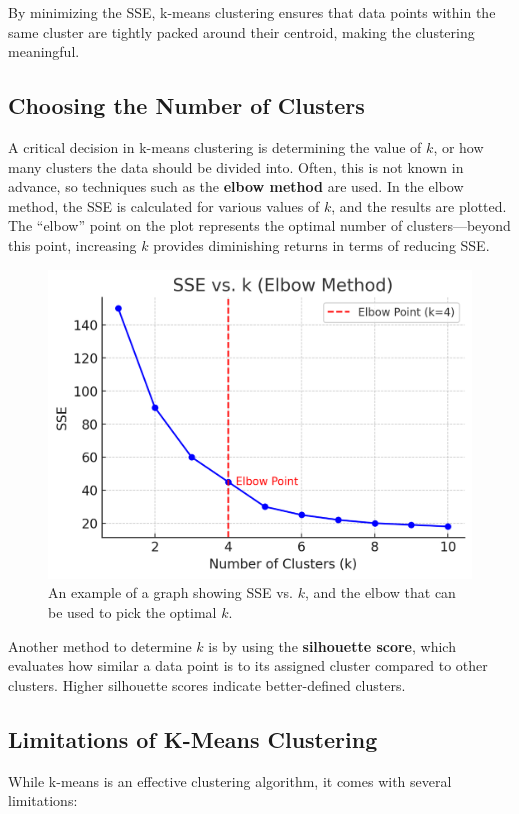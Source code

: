    By minimizing the SSE, k-means clustering ensures that data points within the same cluster are tightly packed around their centroid, making the clustering meaningful.

\subsection{Choosing the Number of Clusters}
    \large A critical decision in k-means clustering is determining the value of \( k \), or how many clusters the data should be divided into. Often, this is not known in advance, so techniques such as the \textbf{elbow method} are used. In the elbow method, the SSE is calculated for various values of \( k \), and the results are plotted. The ``elbow'' point on the plot represents the optimal number of clusters—beyond this point, increasing \( k \) provides diminishing returns in terms of reducing SSE.

    \begin{figure}[H]
        \centering
        \includegraphics[width=0.45\linewidth]{ml/SSEkElbowmethod.png}
        \caption{An example of a graph showing SSE vs. $k$, and the elbow that can be used to pick the optimal $k$.}
        \label{fig:SSEkElbowmethod}
    \end{figure}

    Another method to determine \( k \) is by using the \textbf{silhouette score}, which evaluates how similar a data point is to its assigned cluster compared to other clusters. Higher silhouette scores indicate better-defined clusters.

\subsection{Limitations of K-Means Clustering}
    \large While k-means is an effective clustering algorithm, it comes with several limitations:
    
